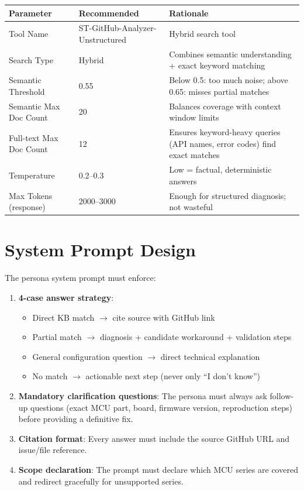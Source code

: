 \documentclass[12pt,a4paper]{report}
\begin{document}
\begin{longtable}{p{5.5cm}p{3cm}p{5cm}}
\toprule
\textbf{Parameter} & \textbf{Recommended} & \textbf{Rationale} \\
\midrule
Tool Name & \footnotesize ST-GitHub-Analyzer-Unstructured & Hybrid search tool \\
Search Type & Hybrid & Combines semantic understanding + exact keyword matching \\
Semantic Threshold & 0.55 & Below 0.5: too much noise; above 0.65: misses partial matches \\
Semantic Max Doc Count & 20 & Balances coverage with context window limits \\
Full-text Max Doc Count & 12 & Ensures keyword-heavy queries (API names, error codes) find exact matches \\
Temperature & 0.2--0.3 & Low = factual, deterministic answers \\
Max Tokens (response) & 2000--3000 & Enough for structured diagnosis; not wasteful \\
\bottomrule
\end{longtable}

\section{System Prompt Design}

The persona system prompt must enforce:

\begin{enumerate}
  \item \textbf{4-case answer strategy}:
  \begin{itemize}
    \item Direct KB match $\to$ cite source with GitHub link
    \item Partial match $\to$ diagnosis + candidate workaround + validation steps
    \item General configuration question $\to$ direct technical explanation
    \item No match $\to$ actionable next step (never only ``I don't know'')
  \end{itemize}

  \item \textbf{Mandatory clarification questions}: The persona must always ask follow-up questions (exact MCU part, board, firmware version, reproduction steps) before providing a definitive fix.

  \item \textbf{Citation format}: Every answer must include the source GitHub URL and issue/file reference.

  \item \textbf{Scope declaration}: The prompt must declare which MCU series are covered and redirect gracefully for unsupported series.
\end{enumerate}
\end{document}
